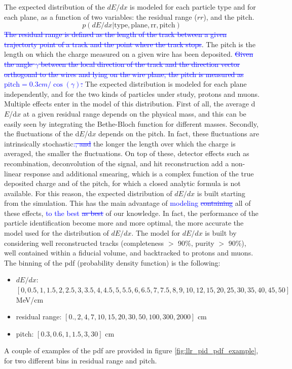 \documentclass[a4paper]{article}
\begin{document}
The expected distribution of the $dE/dx$ is modeled for each particle type and for each plane, as a function of two variables: the residual range ($rr$), and the pitch.
\[ p(dE/dx | \text{type}, \text{plane}, \text{rr}, \text{pitch}) \]
\textcolor{blue}{\st{ The residual range is defined as the length of the track between a given trajectorty point of a track and the point where the track stops}}.
The pitch is the length on which the charge measured on a given wire has been deposited.
\textcolor{blue}{ \st{Given the angle $\gamma$ between the local direction of the track and the direction vector orthogonal to the wires and lying on the wire plane, the pitch is measured as $\text{pitch} = 0.3 cm / \cos(\gamma) $.}}
The expected distribution is modeled for each plane independently, and for the two kinds of particles under study, protons and muons.
Multiple effects enter in the model of this distribution.
First of all, the average d$E$/d$x$ at a given residual range depends on the physical mass, and this can be easily seen by integrating the Bethe-Bloch function for different masses.
Secondly, the fluctuations of the d$E$/d$x$ depends on the pitch.
In fact, these fluctuations are intrinsically stochastic\textcolor{blue}{:\st{, and}} the longer the length over which the charge is averaged, the smaller the fluctuations.
On top of these, detector effects such as recombination, deconvolution of the signal, and hit reconstruction add a non-linear response and additional smearing, which is a complex function of the true deposited charge and of the pitch, for which a closed analytic formula is not available.
For this reason, the expected distribution of $dE/dx$ is built starting from the simulation.
This has the main advantage of \textcolor{blue}{modeling \st{containing}} all of these effects,  \textcolor{blue}{to the best \st{as best}} of our knowledge.
In fact, the performance of the particle identification become more and more optimal, the more accurate the model used for the distribution of $dE/dx$.
The model for $dE/dx$ is built by considering well reconstructed tracks (completeness $>$ 90\%, purity $>$ 90\%), well contained within a fiducial volume, and backtracked to protons and muons.
The binning of the pdf (probability density function) is the following:
\begin{itemize}
    \item $dE/dx$: $[0, 0.5, 1, 1.5, 2, 2.5, 3, 3.5, 4, 4.5, 5, 5.5, 6, 6.5, 7, 7.5, 8, 9, 10, 12, 15, 20, 25, 30, 35, 40, 45, 50]$ MeV/cm
    \item residual range: $[0., 2, 4, 7, 10, 15, 20, 30, 50, 100, 300, 2000]$ cm
    \item pitch: $[0.3, 0.6, 1, 1.5, 3, 30]$ cm
\end{itemize}
A couple of examples of the pdf are provided in figure \ref{fig:llr_pid_pdf_example}, for two different bins in residual range and pitch.
\end{document}
